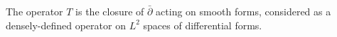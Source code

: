 
The operator $T$ is the closure of $\bar{\partial}$ acting on smooth forms, considered as a densely-defined operator on $L^2$ spaces of differential forms.
